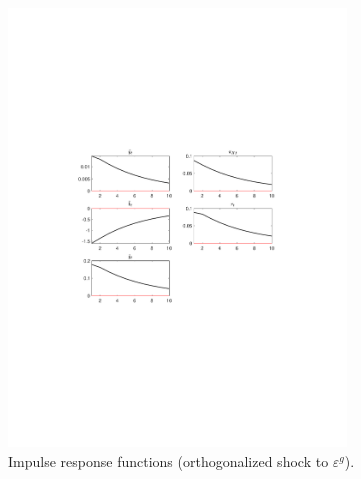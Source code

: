 \begin{figure}[H]
\centering 
\includegraphics[width=0.80\textwidth]{monetary/graphs/monetary_IRF_eps_g}
\caption{Impulse response functions (orthogonalized shock to ${\varepsilon^{g}}$).}
\label{Fig:IRF:eps_g}
\end{figure}
 
 
